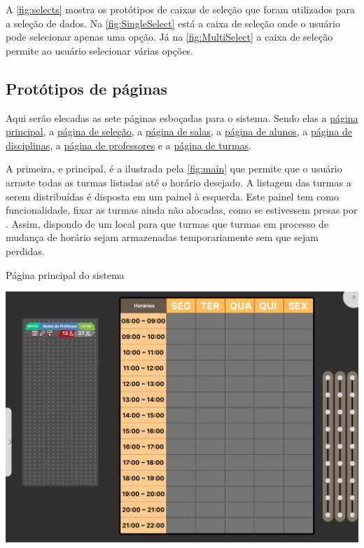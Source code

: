 A \autoref{fig:selects} mostra os protótipos de caixas de seleção que foram utilizados para a seleção de dados. Na \autoref{fig:SingleSelect} está a caixa de seleção onde o usuário pode selecionar apenas uma opção. Já na \autoref{fig:MultiSelect} a caixa de seleção permite ao usuário selecionar várias opções.

\subsection{Protótipos de páginas} \label{ssec:páginas} %

Aqui serão elecadas as sete páginas esboçadas para o sistema. Sendo elas a \hyperref[fig:main]{página principal}, a \hyperref[fig:CRUD_main]{página de seleção}, a \hyperref[fig:CRUD_salas]{página de salas}, a \hyperref[fig:CRUD_alunos]{página de alunos}, a \hyperref[fig:CRUD_disciplinas]{página de disciplinas}, a \hyperref[fig:CRUD_professores]{página de professores} e a \hyperref[fig:CRUD_turmas]{página de turmas}.

A primeira, e principal, é a ilustrada pela \autoref{fig:main} que permite que o usuário arraste todas as turmas listadas até o horário desejado. A listagem das turmas a serem distribuídas é disposta em um painel à esquerda. Este painel tem como funcionalidade, fixar as turmas ainda não alocadas, como se estivessem presas por . Assim, dispondo de um local para que turmas que turmas em processo de mudança de horário sejam armazenadas temporariamente sem que sejam perdidas.

\begin{MyCenteredFigure} \caption{Página principal do sistema} \label{fig:main}
  \includegraphics[width=\textwidth]{files/img/2.02!5-desenvolvimento/2.02!5.1.3-prototipagem/2.02!5.1.3.2-paginas/main}
\end{MyCenteredFigure}


